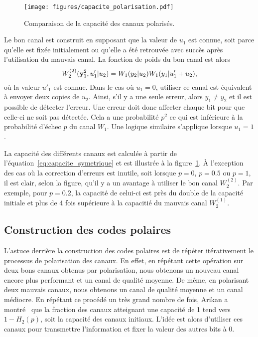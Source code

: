 \begin{figure}
  \begin{center}
    \texttt{[image: figures/capacite\_polarisation.pdf]}
  \end{center}
  \caption[Capacité des canaux polarisés]{Comparaison de la capacité des canaux polarisés.}
  \label{fig:capacite_polarisation}
\end{figure}

Le bon canal est construit en supposant que la valeur de $u_1$ est connue,
soit parce qu'elle est fixée initialement ou qu'elle a été retrouvée avec succès
après l'utilisation du mauvais canal.
La fonction de poids du bon canal est alors
\begin{equation}
  W_2^{(2)}(\vb y_1^2, u'_1 | u_2) 
  = W_1(y_2 | u_2) W_1(y_1 | u'_1 + u_2),
\end{equation}
où la valeur $u'_1$ est connue. 
Dans le cas où $u_1 = 0$, 
utiliser ce canal est équivalent à envoyer deux copies de $u_2$. 
Ainsi, 
s'il y a une seule erreur, alors $y_1 \neq y_2$ et il est possible de détecter l'erreur.
Une erreur doit donc affecter chaque bit pour que celle-ci ne soit pas détectée.
Cela a une probabilité $p^2$ ce qui est inférieure à la probabilité d'échec $p$ du canal $W_1$.
Une logique similaire s'applique lorsque $u_1 = 1$.

La capacité des différents canaux est calculée à partir 
de l'équation~\eqref{eq:capacite_symetrique}
et est illustrée à la figure~\ref{fig:capacite_polarisation}.
À l'exception des cas où la correction d'erreurs est inutile,
soit lorsque $p = 0$, $p =0.5$ ou $p = 1$,
il est clair, selon la figure, qu'il y a un avantage à utiliser le bon canal $W_2^{(2)}$.
Par exemple, pour $p = 0.2$, la capacité de celui-ci est près du double 
de la capacité initiale et plus de 4 fois supérieure à la capacitié du mauvais canal $W_2^{(1)}$.

\subsection{Construction des codes polaires}

L'astuce derrière la construction des codes polaires est de répéter itérativement le 
processus de polarisation des canaux.
En effet, 
en répétant cette opération sur deux bons canaux obtenus par polarisation,
nous obtenons un nouveau canal encore plus performant et un canal de qualité moyenne.
De même,
en polarisant deux mauvais canaux, nous obtenons un canal de qualité moyenne et 
un canal médiocre.
En répétant ce procédé un très grand nombre de fois,
Arikan a montré~\cite{arikan_channel_2009} 
que la fraction des canaux atteignant une capacité de 1
tend vers $1 - H_2(p)$, soit la capacité des canaux initiaux.
L'idée est alors d'utiliser ces canaux pour transmettre l'information
et fixer la valeur des autres bits à 0.


